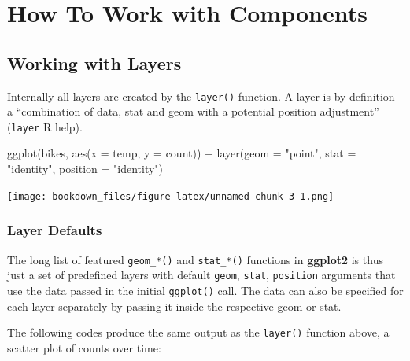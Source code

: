 \documentclass[
]{krantz}
\makeatletter
\newenvironment{Shaded}{\begin{snugshade}}{\end{snugshade}}
\newcommand{\AttributeTok}[1]{\textcolor[rgb]{0.61,0.61,0.61}{#1}}
\newcommand{\FunctionTok}[1]{\textcolor[rgb]{0,0,0}{#1}}
\newcommand{\NormalTok}[1]{#1}
\newcommand{\SpecialCharTok}[1]{\textcolor[rgb]{0,0,0}{#1}}
\newcommand{\StringTok}[1]{\textcolor[rgb]{0.5,0.5,0.5}{#1}}
\newenvironment{kframe}{%
\medskip{}
\setlength{\fboxsep}{.8em}
 \def\at@end@of@kframe{}%
 \ifinner\ifhmode%
  \def\at@end@of@kframe{\end{minipage}}%
  \begin{minipage}{\columnwidth}%
 \fi\fi%
 \def\FrameCommand##1{\hskip\@totalleftmargin \hskip-\fboxsep
 \colorbox{shadecolor}{##1}\hskip-\fboxsep
     \hskip-\linewidth \hskip-\@totalleftmargin \hskip\columnwidth}%
 \MakeFramed {\advance\hsize-\width
   \@totalleftmargin\z@ \linewidth\hsize
   \@setminipage}}%
 {\par\unskip\endMakeFramed%
 \at@end@of@kframe}
\renewenvironment{Shaded}{\begin{kframe}}{\end{kframe}}
\makeatother
\begin{document}
\hypertarget{part-how-to-work-with-components}{%
\part{How To Work with Components}\label{part-how-to-work-with-components}}

\hypertarget{working-with-layers}{%
\chapter{Working with Layers}\label{working-with-layers}}

Internally all layers are created by the \texttt{layer()} function. A layer is by definition a ``combination of data, stat and geom with a potential position adjustment'' (\texttt{layer} R help).

\begin{Shaded}
\begin{Highlighting}[]
\FunctionTok{ggplot}\NormalTok{(bikes, }\FunctionTok{aes}\NormalTok{(}\AttributeTok{x =}\NormalTok{ temp, }\AttributeTok{y =}\NormalTok{ count)) }\SpecialCharTok{+}
  \FunctionTok{layer}\NormalTok{(}\AttributeTok{geom =} \StringTok{"point"}\NormalTok{, }\AttributeTok{stat =} \StringTok{"identity"}\NormalTok{, }\AttributeTok{position =} \StringTok{"identity"}\NormalTok{)}
\end{Highlighting}
\end{Shaded}

\texttt{[image: bookdown\_files/figure-latex/unnamed-chunk-3-1.png]}

\hypertarget{layer-defaults}{%
\section{Layer Defaults}\label{layer-defaults}}

The long list of featured \texttt{geom\_*()} and \texttt{stat\_*()} functions in \textbf{ggplot2} is thus just a set of predefined layers with default \texttt{geom}, \texttt{stat}, \texttt{position} arguments that use the data passed in the initial \texttt{ggplot()} call. The data can also be specified for each layer separately by passing it inside the respective geom or stat.

The following codes produce the same output as the \texttt{layer()} function above, a scatter plot of counts over time:
\end{document}
